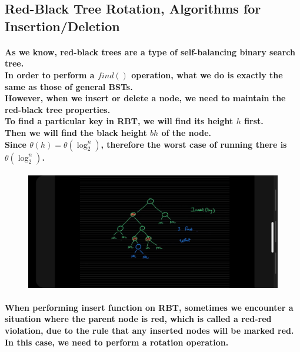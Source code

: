 \documentclass{article}
\begin{document}
\subsection{Red-Black Tree Rotation, Algorithms for Insertion/Deletion}

\paragraph{
    As we know, red-black trees are a type of self-balancing binary search tree.\\
    In order to perform a $find()$ operation, what we do is exactly the same as those of general BSTs.\\
    However, when we insert or delete a node, we need to maintain the red-black tree properties.\\
    To find a particular key in RBT, we will find its height $h$ first.\\
    Then we will find the black height $bh$ of the node.\\
    Since $\theta(h) = \theta(\log_2^n)$, therefore the worst case of running there is $\theta(\log_2^n)$.\\
}

\begin{figure}[H]
    \includegraphics[width=\textwidth]{rbtinsertingakey.jpg}
\end{figure}


\paragraph{
    When performing insert function on RBT, sometimes we encounter a situation where the parent node is red,
    which is called a red-red violation, due to the rule that any inserted nodes will be marked red.\\
    In this case, we need to perform a rotation operation.\\
}
\end{document}
